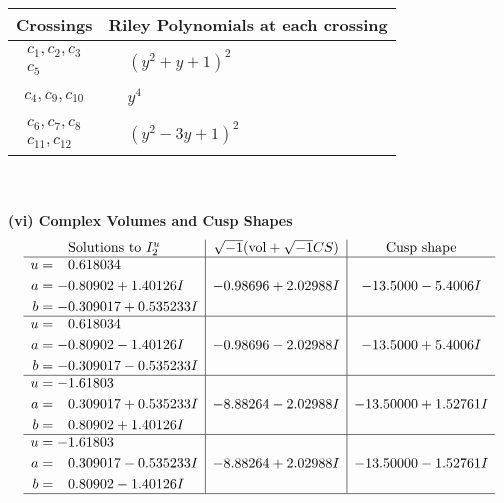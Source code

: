 \documentclass[1p]{elsarticle_modified}
\theoremstyle{definition}
\newcommand{\I}{\sqrt{-1}}
\begin{document}
\begin{tabular}{m{50pt}|m{274pt}}
Crossings & \hspace{64pt}Riley Polynomials at each crossing \\
\hline $$\begin{aligned}c_{1},c_{2},c_{3}\\c_{5}\end{aligned}$$&$\begin{aligned}
&(y^2+y+1)^2
\end{aligned}$\\
\hline $$\begin{aligned}c_{4},c_{9},c_{10}\end{aligned}$$&$\begin{aligned}
&y^4
\end{aligned}$\\
\hline $$\begin{aligned}c_{6},c_{7},c_{8}\\c_{11},c_{12}\end{aligned}$$&$\begin{aligned}
&(y^2-3 y+1)^2
\end{aligned}$\\
\hline
\end{tabular}\\~\\
\newpage\flushleft \textbf{(vi) Complex Volumes and Cusp Shapes}
$$\begin{array}{c|c|c}  
\text{Solutions to }I^u_{2}& \I (\text{vol} + \sqrt{-1}CS) & \text{Cusp shape}\\
 \hline 
\begin{aligned}
u &= \phantom{-}0.618034\phantom{ +0.000000I} \\
a &= -0.80902 + 1.40126 I \\
b &= -0.309017 + 0.535233 I\end{aligned}
 & -0.98696 + 2.02988 I & -13.5000 - 5.4006 I \\ \hline\begin{aligned}
u &= \phantom{-}0.618034\phantom{ +0.000000I} \\
a &= -0.80902 - 1.40126 I \\
b &= -0.309017 - 0.535233 I\end{aligned}
 & -0.98696 - 2.02988 I & -13.5000 + 5.4006 I \\ \hline\begin{aligned}
u &= -1.61803\phantom{ +0.000000I} \\
a &= \phantom{-}0.309017 + 0.535233 I \\
b &= \phantom{-}0.80902 + 1.40126 I\end{aligned}
 & -8.88264 - 2.02988 I & -13.50000 + 1.52761 I \\ \hline\begin{aligned}
u &= -1.61803\phantom{ +0.000000I} \\
a &= \phantom{-}0.309017 - 0.535233 I \\
b &= \phantom{-}0.80902 - 1.40126 I\end{aligned}
 & -8.88264 + 2.02988 I & -13.50000 - 1.52761 I\\
 \hline 
 \end{array}$$\newpage
\end{document}
